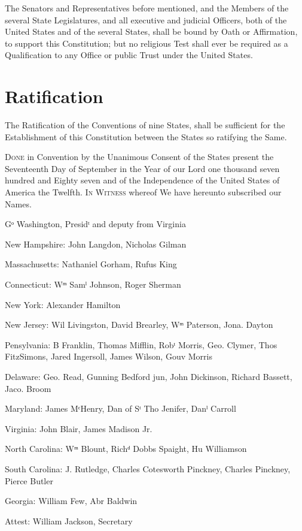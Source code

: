 \documentclass{constitution}
\begin{document}
The Senators and Representatives before mentioned,
and the Members of the several State Legislatures,
and all executive and judicial Officers, both of the United States and of the several States,
shall be bound by Oath or Affirmation, to support this Constitution;
but no religious Test shall ever be required as a Qualification to any Office or public Trust under the United States.

\chapter{Ratification}
The Ratification of the Conventions of nine States,
shall be sufficient for the Establishment of this Constitution
between the States so ratifying the Same.

\textsc{Done} in Convention by the Unanimous Consent of the States present
the Seventeenth Day of September
in the Year of our Lord one thousand seven hundred and Eighty seven
and of the Independence of the United States of America the Twelfth.
\textsc{In Witness} whereof We have hereunto subscribed our Names.

Gᵒ Washington, Presidᵗ and deputy from Virginia

New Hampshire:		John Langdon, Nicholas Gilman

Massachusetts:		Nathaniel Gorham, Rufus King

Connecticut:		Wᵐ Samˡ Johnson, Roger Sherman

New York:		Alexander Hamilton

New Jersey:		Wil Livingston, David Brearley, Wᵐ Paterson, Jona. Dayton

Pensylvania:		B Franklin, Thomas Mifflin, Robᵗ Morris, Geo. Clymer, Thos FitzSimons,
			Jared Ingersoll, James Wilson, Gouv Morris

Delaware:		Geo. Read, Gunning Bedford jun, John Dickinson, Richard Bassett, Jaco. Broom

Maryland:		James MᶜHenry, Dan of Sᵗ Tho Jenifer, Danˡ Carroll

Virginia:		John Blair, James Madison Jr.

North Carolina:	Wᵐ Blount, Richᵈ Dobbs Spaight, Hu Williamson

South Carolina:	J. Rutledge, Charles Cotesworth Pinckney, Charles Pinckney, Pierce Butler

Georgia:		William Few, Abr Baldwin

Attest: William Jackson, Secretary
\end{document}
